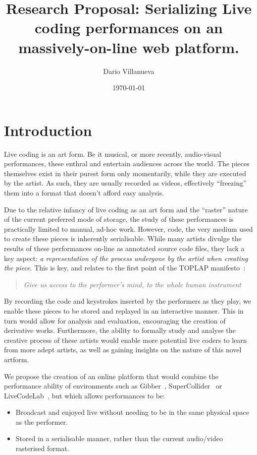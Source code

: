 \documentclass[12pt]{article}
\title{Research Proposal: Serializing Live coding performances on an massively-on-line web
platform.}
\date{\today}
\author{Dario Villanueva}
\begin{document}
\maketitle


\section{Introduction}\label{introduction}

Live coding is an art form. Be it musical, or more recently, audio-visual performances, these enthral and entertain audiences across the world. The pieces themselves exist in their purest form only momentarily, while they are executed by the artist. As such, they are usually recorded as videos, effectively ``freezing'' them into a format that doesn't afford easy analysis.

Due to the relative infancy of live coding as an art form and the ``raster'' nature of the current preferred mode of storage, the study of these performances is practically limited to manual, ad-hoc work. However, code, the very medium used to create these pieces is inherently serialisable. While many artists divulge the results of these performances on-line as annotated source code files, they lack a key aspect: \emph{a representation of the process undergone by the artist when creating the piece}. This is key, and relates to the first point of the TOPLAP manifesto~\cite{toplap-manifesto}:

\begin{quote}
\emph{Give us access to the performer's mind, to the whole human instrument}
\end{quote}

By recording the code and keystrokes inserted by the performers as they play, we enable these pieces to be stored and replayed in an interactive manner. This in turn would allow for analysis and evaluation, encouraging the creation of derivative works. Furthermore, the ability to formally study and analyse the creative process of these artists would enable more potential live coders to learn from more adept artists, as well as gaining insights on the nature of this novel artform.

We propose the creation of an online platform that would combine the performance ability of environments such as Gibber~\cite{gibber}, SuperCollider~\cite{supercollider} or LiveCodeLab~\cite{livecodelab}, but which allows performances to be:

\begin{itemize}
\item Broadcast and enjoyed live without needing to be in the same physical
space as the performer.
\item Stored in a serialisable manner, rather than the
current audio/video rasterised format.
\end{itemize}
\end{document}
